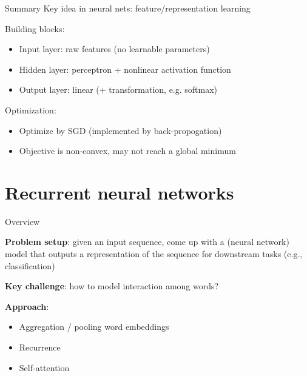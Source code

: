 \documentclass[usenames,dvipsnames,notes,11pt,aspectratio=169,hyperref={colorlinks=true, linkcolor=blue}]{beamer}
\begin{document}
\begin{frame}
    {Summary}
    Key idea in neural nets: feature/representation learning 

    Building blocks:\\
    \begin{itemize}
        \item Input layer: raw features (no learnable parameters)
        \item Hidden layer: perceptron + nonlinear activation function
        \item Output layer: linear (+ transformation, e.g. softmax)
    \end{itemize}

    Optimization:\\
    \begin{itemize}
        \item Optimize by SGD (implemented by back-propogation)
        \item Objective is non-convex, may not reach a global minimum
    \end{itemize}
\end{frame}

\section{Recurrent neural networks}

\begin{frame}
    {Overview}
    
    \textbf{Problem setup}: given an input sequence, come up with a (neural network) model that outputs a representation of the sequence for downstream tasks (e.g., classification)
    \pause

    \textbf{Key challenge}: how to model interaction among words?

    \pause
    \textbf{Approach}:\\
    \begin{itemize}
        \item Aggregation / pooling word embeddings
        \item Recurrence
        \item Self-attention
    \end{itemize}
\end{frame}
\end{document}
